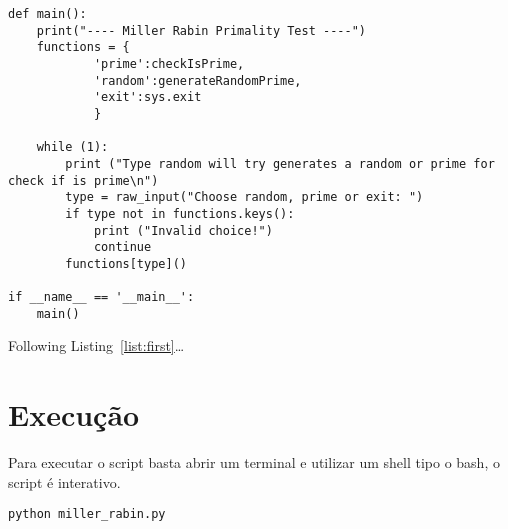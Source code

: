 \documentclass[a4paper,11pt]{article}
\theoremstyle{mytheor}
\begin{document}
\begin{lstlisting}[label={list:first},caption=Miller Rabin prime test em Python.]
def main():
    print("---- Miller Rabin Primality Test ----")
    functions = {
            'prime':checkIsPrime,
            'random':generateRandomPrime,
            'exit':sys.exit
            }
    
    while (1):
        print ("Type random will try generates a random or prime for check if is prime\n")
        type = raw_input("Choose random, prime or exit: ")
        if type not in functions.keys():
            print ("Invalid choice!")
            continue
        functions[type]()

if __name__ == '__main__':
    main()
\end{lstlisting}

Following Listing~\ref{list:first}\ldots{} 

\section*{Execução}

Para executar o script basta abrir um terminal e utilizar um shell tipo o bash, o script é interativo.

\begin{lstlisting}[label={list:second},caption=Executando o script.]
python miller_rabin.py
\end{lstlisting}
\end{document}
